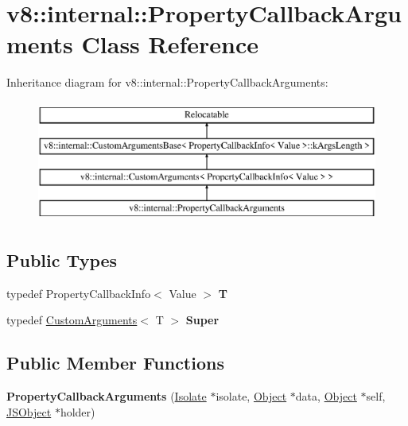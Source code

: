 \hypertarget{classv8_1_1internal_1_1_property_callback_arguments}{}\section{v8\+:\+:internal\+:\+:Property\+Callback\+Arguments Class Reference}
\label{classv8_1_1internal_1_1_property_callback_arguments}
Inheritance diagram for v8\+:\+:internal\+:\+:Property\+Callback\+Arguments\+:\begin{figure}[H]
\begin{center}
\leavevmode
\includegraphics[height=4.000000cm]{classv8_1_1internal_1_1_property_callback_arguments}
\end{center}
\end{figure}
\subsection*{Public Types}
\begin{DoxyCompactItemize}
\item 
\hypertarget{classv8_1_1internal_1_1_property_callback_arguments_a4a81899f78a5d50709980730f670aa48}{}typedef Property\+Callback\+Info$<$ Value $>$ {\bfseries T}\label{classv8_1_1internal_1_1_property_callback_arguments_a4a81899f78a5d50709980730f670aa48}

\item 
\hypertarget{classv8_1_1internal_1_1_property_callback_arguments_a80f9d07cc7e4412c0f87aa36c0c6bd35}{}typedef \hyperlink{classv8_1_1internal_1_1_custom_arguments}{Custom\+Arguments}$<$ T $>$ {\bfseries Super}\label{classv8_1_1internal_1_1_property_callback_arguments_a80f9d07cc7e4412c0f87aa36c0c6bd35}

\end{DoxyCompactItemize}
\subsection*{Public Member Functions}
\begin{DoxyCompactItemize}
\item 
\hypertarget{classv8_1_1internal_1_1_property_callback_arguments_a421ff9b268592eb7c79f84b23b4d933f}{}{\bfseries Property\+Callback\+Arguments} (\hyperlink{classv8_1_1internal_1_1_isolate}{Isolate} $\ast$isolate, \hyperlink{classv8_1_1internal_1_1_object}{Object} $\ast$data, \hyperlink{classv8_1_1internal_1_1_object}{Object} $\ast$self, \hyperlink{classv8_1_1internal_1_1_j_s_object}{J\+S\+Object} $\ast$holder)\label{classv8_1_1internal_1_1_property_callback_arguments_a421ff9b268592eb7c79f84b23b4d933f}

\end{DoxyCompactItemize}
